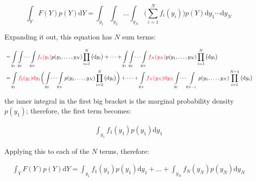 \documentclass{article}
\def\d{\text{d}}
\begin{document}
\begin{equation}
\int_Y F(Y) p(Y) \d Y = \int_{y_1} \int_{y_2}\dots \int_{y_N}  \Big(   \sum_{i=1}^N f_i(y_i) \Big) p(Y) \d y_1 \cdots \d y_N
\end{equation}

Expanding it out, this equation has $N$ sum terms:

\begin{equation}\begin{split}
&= \int\limits_{y_1} \int\limits_{y_2} \dots \int\limits_{y_N}  {\color{red} f_1(y_1)} p(y_1,\dots,y_N) \prod_{i=1}^N \big( \d y_i \big)
+ \dots + \int\limits_{y_1} \int\limits_{y_2} \dots \int\limits_{y_N}  {\color{red}f_N(y_N)} p(y_1,\dots,y_N) \prod_{i=1}^N \big( \d y_i \big)\\ 
&= \int\limits_{y_1} {\color{red} f_1(y_1) \d y_1} \bigg( \int\limits_{y_2} \dots \int\limits_{y_N}  p(y_1,\dots,y_N) \prod_{i=2}^N \big(  \d y_i \big) \bigg)+ \dots
+ \int\limits_{y_N}  {\color{red}f_N(y_N) \d y_N}\int\limits_{y_1} \dots \int\limits_{y_{N-1}}  p(y_1,\dots,y_N) \prod_{i=1}^{N-1} \big( \d y_i \big)\\ 
\end{split}\end{equation}

the inner integral in the first big bracket is the marginal probability density $p(y_1)$; therefore, the first term becomes:

\begin{equation}\begin{split}
\int_{y_1} f_1(y_1) p(y_1) \d y_1
\end{split}\end{equation}

Applying this to each of the $N$ terms, therefore:

\begin{equation}
\begin{split}
\int_Y F(Y) p(Y) \d Y =  \int_{y_1} f_1(y_1) p(y_1) \d y_1 + \dots +  \int_{y_N} f_N(y_N) p(y_N) \d y_N
\end{split}
\end{equation}



\end{document}
